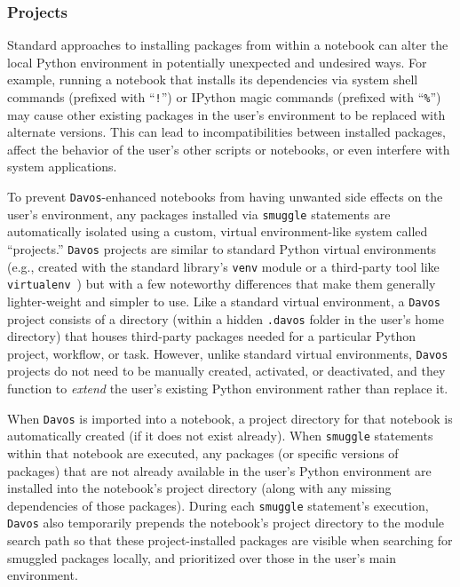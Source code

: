 \documentclass[preprint,12pt,a4paper]{elsarticle}
\begin{document}
\subsubsection{Projects}\label{subsec:projects}

Standard approaches to installing packages from within a notebook can alter the local Python environment in potentially unexpected and undesired ways.
For example, running a notebook that installs its dependencies via system shell commands (prefixed with ``\texttt{!}'') or IPython magic commands (prefixed with ``\texttt{\%}'') may cause other existing packages in the user's environment to be replaced with alternate versions.
This can lead to incompatibilities between installed packages, affect the behavior of the user's other scripts or notebooks, or even interfere with system applications.

To prevent \texttt{Davos}-enhanced notebooks from having unwanted side effects on the user's environment, any packages installed via \texttt{smuggle} statements are automatically isolated using a custom, virtual environment-like system called ``projects.''
\texttt{Davos} projects are similar to standard Python virtual environments (e.g., created with the standard library's \texttt{venv} module or a third-party tool like \texttt{virtualenv}~\cite{BickEtal07}) but with a few noteworthy differences that make them generally lighter-weight and simpler to use.
Like a standard virtual environment, a \texttt{Davos} project consists of a directory (within a hidden \texttt{.davos} folder in the user's home directory) that houses third-party packages needed for a particular Python project, workflow, or task.
However, unlike standard virtual environments, \texttt{Davos} projects do not need to be manually created, activated, or deactivated, and they function to \textit{extend} the user's existing Python environment rather than replace it.

When \texttt{Davos} is imported into a notebook, a project directory for that notebook is automatically created (if it does not exist already).
When \texttt{smuggle} statements within that notebook are executed, any packages (or specific versions of packages) that are not already available in the user's Python environment are installed into the notebook's project directory (along with any missing dependencies of those packages).
During each \texttt{smuggle} statement's execution, \texttt{Davos} also temporarily prepends the notebook's project directory to the module search path so that these project-installed packages are visible when searching for smuggled packages locally, and prioritized over those in the user's main environment.
\end{document}
